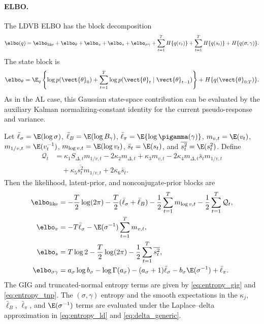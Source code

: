 \paragraph{ELBO.}
The LDVB ELBO has the block decomposition
\begin{equation}
\elbo(q)=
\elbo_{\mathrm{like}}+\elbo_\theta+\elbo_v+\elbo_s+\elbo_{\sigma\gamma}
+\sum_{t=1}^TH\{q(v_t)\}
+\sum_{t=1}^TH\{q(s_t)\}
+H\{q(\sigma,\gamma)\}.
\label{eq:dyn_exdqlm_elbo}
\end{equation}
The state block is
\begin{equation}
\elbo_\theta
=\E_q\left\{\log p(\vect{\theta}_0)
+\sum_{t=1}^T\log p(\vect{\theta}_t\mid\vect{\theta}_{t-1})\right\}
+H\{q(\vect{\theta}_{0:T})\}.
\label{eq:dyn_exdqlm_elbo_theta}
\end{equation}
As in the AL case, this Gaussian state-space contribution can be evaluated by
the auxiliary Kalman normalizing-constant identity for the current
pseudo-response and variance.

Let
$\bar\ell_\sigma=\E(\log\sigma)$,
$\bar\ell_B=\E(\log B_\gamma)$,
$\bar\ell_{\pi}=\E\{\log\pigamma(\gamma)\}$,
$m_{v,t}=\E(v_t)$, $m_{1/v,t}=\E(v_t^{-1})$,
$m_{\log v,t}=\E(\log v_t)$, $\bar s_t=\E(s_t)$, and
$\overline{s_t^2}=\E(s_t^2)$. Define
\begin{align}
\mathcal{Q}_t
&=
\kappa_1S_{\Delta,t}m_{1/v,t}
-2\kappa_2m_{\Delta,t}
+\kappa_3m_{v,t}
-2\kappa_4m_{\Delta,t}\bar s_t m_{1/v,t} \nonumber\\
&\quad
+\kappa_5\overline{s_t^2}m_{1/v,t}
+2\kappa_6\bar s_t.
\label{eq:dyn_exdqlm_elbo_mathcalQ}
\end{align}
Then the likelihood, latent-prior, and nonconjugate-prior blocks are
\begin{align}
\elbo_{\mathrm{like}}
&=
-\frac{T}{2}\log(2\pi)
-\frac{T}{2}(\bar\ell_\sigma+\bar\ell_B)
-\frac{1}{2}\sum_{t=1}^Tm_{\log v,t}
-\frac{1}{2}\sum_{t=1}^T\mathcal{Q}_t,\\
\elbo_v
&=
-T\bar\ell_\sigma-\E(\sigma^{-1})\sum_{t=1}^Tm_{v,t},\\
\elbo_s
&=
T\log 2-\frac{T}{2}\log(2\pi)
-\frac{1}{2}\sum_{t=1}^T\overline{s_t^2},\\
\elbo_{\sigma\gamma}
&=
a_\sigma\log b_\sigma-\log\Gamma(a_\sigma)
-(a_\sigma+1)\bar\ell_\sigma
-b_\sigma\E(\sigma^{-1})
+\bar\ell_{\pi}.
\label{eq:dyn_exdqlm_elbo_terms}
\end{align}
The GIG and truncated-normal entropy terms are given by
\eqref{eq:entropy_gig} and \eqref{eq:entropy_tnp}. The
$(\sigma,\gamma)$ entropy and the smooth expectations in the $\kappa_j$,
$\bar\ell_B$, $\bar\ell_\pi$, and $\E(\sigma^{-1})$ terms are evaluated under
the Laplace--delta approximation in \eqref{eq:entropy_ld} and
\eqref{eq:delta_generic}.

